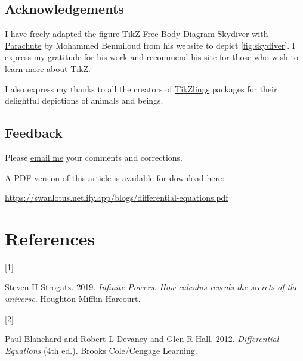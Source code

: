 \documentclass[
  a4paper,
]{article}
\newlength{\cslhangindent}
\newlength{\csllabelwidth}
\newenvironment{CSLReferences}[2] %
 {\begin{list}{}{%
  \setlength{\itemindent}{0pt}
  \setlength{\leftmargin}{0pt}
  \setlength{\parsep}{0pt}
  \ifodd #1
   \setlength{\leftmargin}{\cslhangindent}
   \setlength{\itemindent}{-1\cslhangindent}
  \fi
  \setlength{\itemsep}{#2\baselineskip}}}
 {\end{list}}
\newcommand{\CSLLeftMargin}[1]{\parbox[t]{\csllabelwidth}{\strut#1\strut}}
\newcommand{\CSLRightInline}[1]{\parbox[t]{\linewidth - \csllabelwidth}{\strut#1\strut}}
\begin{document}
\subsection{Acknowledgements}\label{acknowledgements}

I have freely adapted the figure
\href{https://latexdraw.com/tikz-free-body-diagram-skydiver-with-parachute/}{TikZ
Free Body Diagram Skydiver with Parachute} by Mohammed Benmiloud from
his website to depict \cref{fig:skydiver}. I express my gratitude for
his work and recommend his site for those who wish to learn more about
\href{https://en.wikipedia.org/wiki/PGF/TikZ}{TikZ}.

I also express my thanks to all the creators of
\href{https://github.com/samcarter/tikzlings}{TikZlings} packages for
their delightful depictions of animals and beings.

\subsection{Feedback}\label{feedback}

Please \href{mailto:feedback.swanlotus@gmail.com}{email me} your
comments and corrections.

\noindent A PDF version of this article is
\href{./differetial-equations.pdf}{available for download here}:

\begin{sffamily}

\url{https://swanlotus.netlify.app/blogs/differential-equations.pdf}

\end{sffamily}

\section*{References}\label{bibliography}

\label{refs}
\begin{CSLReferences}{0}{0}
\CSLLeftMargin{{[}1{]} }%
\CSLRightInline{Steven H Strogatz. 2019. \emph{{Infinite Powers}: {How
calculus reveals the secrets of the universe}}. Houghton Mifflin
Harcourt.}

\CSLLeftMargin{{[}2{]} }%
\CSLRightInline{Paul Blanchard and Robert L Devaney and Glen R Hall.
2012. \emph{{Differential Equations}} (4th ed.). Brooks Cole/Cengage
Learning.}

\end{CSLReferences}
\end{document}
